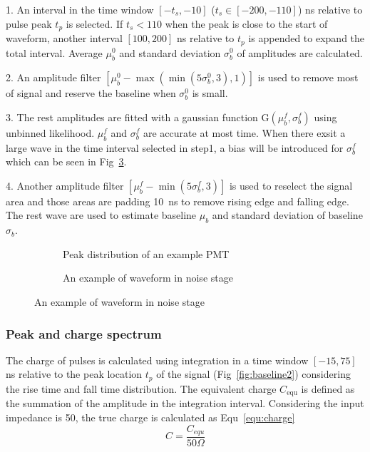 1. An interval in the time window $[-t_s,-10]$ ($t_s\in[-200,-110]$) ns relative to pulse peak $t_p$ is selected. If $t_s<110$ when the peak is close to the start of waveform, another interval $[100,200]$ ns relative to $t_p$ is appended to expand the total interval. Average $\mu_b^0$ and standard deviation $\sigma_b^0$ of amplitudes are calculated.

2. An amplitude filter $[\mu_b^0-\max(\min(5\sigma_b^0,3),1)]$ is used to remove most of signal and reserve the baseline when $\sigma_b^0$ is small.

3. The rest amplitudes are fitted with a gaussian function G$(\mu_b^f,\sigma_b^f)$ using unbinned likelihood. $\mu_b^f$ and $\sigma_b^f$ are accurate at most time. When there exsit a large wave in the time interval selected in step1, a bias will be introduced for $\sigma_b^f$ which can be seen in Fig~\ref{fig:baselineBias2}.

4. Another amplitude filter $[\mu_b^f-\min(5\sigma_b^f,3)]$ is used to reselect the signal area and those areas are padding \SI{10}{ns} to remove rising edge and falling edge. The rest wave are used to estimate baseline $\mu_b$ and standard deviation of baseline $\sigma_b$.
\begin{figure}[!htbp]
    \centering
    \begin{subfigure}[b]{0.7\textwidth}
        \caption{Peak distribution of an example PMT}%
        \label{fig:baselineBias1}
    \end{subfigure}
    \begin{subfigure}[b]{0.3\textwidth}
        \caption{An example of waveform in noise stage}
        \label{fig:baselineBias2}
    \end{subfigure}
\end{figure}

\subsubsection{Peak and charge spectrum}
\label{sec:noisepeak}
The charge of pulses is calculated using integration in a time window $[-15, 75]$ ns relative to the peak location $t_p$ of the signal (Fig~\ref{fig:baseline2}) considering the rise time and fall time distribution. The equivalent charge $C_{\mathrm{equ}}$ is defined as the summation of the amplitude in the integration interval. Considering the input impedance is \SI{50}{\Omega}, the true charge is calculated as Equ~\eqref{equ:charge} 
\begin{equation}
    \label{equ:charge}
    C = \frac{C_{equ}}{50\Omega}
\end{equation}


